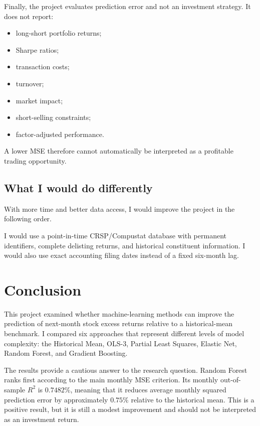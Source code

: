 \documentclass[11pt,a4paper]{article}
\begin{document}
Finally, the project evaluates prediction error and not an investment strategy.
It does not report:

\begin{itemize}
  \item long-short portfolio returns;
  \item Sharpe ratios;
  \item transaction costs;
  \item turnover;
  \item market impact;
  \item short-selling constraints;
  \item factor-adjusted performance.
\end{itemize}

A lower MSE therefore cannot automatically be interpreted as a profitable
trading opportunity.


\subsection{What I would do differently}

With more time and better data access, I would improve the project in the
following order.

I would use a point-in-time CRSP/Compustat database with permanent
identifiers, complete delisting returns, and historical constituent
information. I would also use exact accounting filing dates instead of a fixed
six-month lag.



\section{Conclusion}
\label{sec:conclusion}

This project examined whether machine-learning methods can improve the
prediction of next-month stock excess returns relative to a historical-mean
benchmark. I compared six approaches that represent different levels of model
complexity: the Historical Mean, OLS-3, Partial Least Squares, Elastic Net,
Random Forest, and Gradient Boosting.

The results provide a cautious answer to the research question. Random Forest
ranks first according to the main monthly MSE criterion. Its monthly
out-of-sample \(R^2\) is \(0.7482\%\), meaning that it reduces average monthly
squared prediction error by approximately \(0.75\%\) relative to the historical
mean. This is a positive result, but it is still a modest improvement and should
not be interpreted as an investment return.
\end{document}

